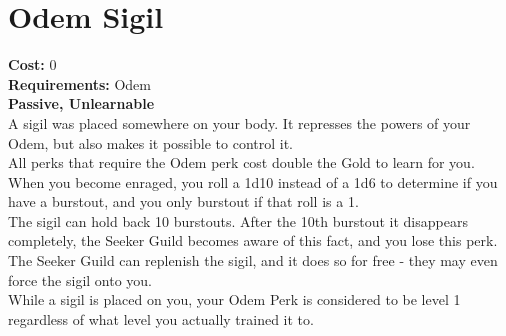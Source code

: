 \section*{Odem Sigil}
\textbf{Cost:} 0\\
\textbf{Requirements:} Odem\\
\textbf{Passive, Unlearnable}\\
A sigil was placed somewhere on your body. It represses the powers of your Odem, but also makes it possible to control it.\\
All perks that require the Odem perk cost double the Gold to learn for you.\\
When you become enraged, you roll a 1d10 instead of a 1d6 to determine if you have a burstout, and you only burstout if that roll is a 1.\\
The sigil can hold back 10 burstouts. After the 10th burstout it disappears completely, the Seeker Guild becomes aware of this fact, and you lose this perk. The Seeker Guild can replenish the sigil, and it does so for free - they may even force the sigil onto you.\\
While a sigil is placed on you, your Odem Perk is considered to be level 1 regardless of what level you actually trained it to.\\
